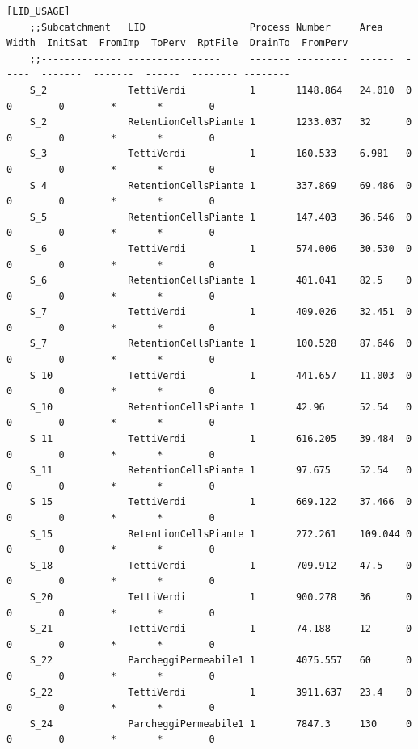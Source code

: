     \begin{landscape}
    \begin{lstlisting}[basicstyle=\scriptsize\ttfamily,numberstyle=\tiny]
    [LID_USAGE]
    ;;Subcatchment   LID                  Process Number     Area    Width  InitSat  FromImp  ToPerv  RptFile  DrainTo  FromPerv
    ;;-------------- ----------------     ------- ---------  ------  -----  -------  -------  ------  -------- --------
    S_2              TettiVerdi           1       1148.864   24.010  0      0        0        *       *        0
    S_2              RetentionCellsPiante 1       1233.037   32      0      0        0        *       *        0
    S_3              TettiVerdi           1       160.533    6.981   0      0        0        *       *        0
    S_4              RetentionCellsPiante 1       337.869    69.486  0      0        0        *       *        0
    S_5              RetentionCellsPiante 1       147.403    36.546  0      0        0        *       *        0
    S_6              TettiVerdi           1       574.006    30.530  0      0        0        *       *        0
    S_6              RetentionCellsPiante 1       401.041    82.5    0      0        0        *       *        0
    S_7              TettiVerdi           1       409.026    32.451  0      0        0        *       *        0
    S_7              RetentionCellsPiante 1       100.528    87.646  0      0        0        *       *        0
    S_10             TettiVerdi           1       441.657    11.003  0      0        0        *       *        0
    S_10             RetentionCellsPiante 1       42.96      52.54   0      0        0        *       *        0
    S_11             TettiVerdi           1       616.205    39.484  0      0        0        *       *        0
    S_11             RetentionCellsPiante 1       97.675     52.54   0      0        0        *       *        0
    S_15             TettiVerdi           1       669.122    37.466  0      0        0        *       *        0
    S_15             RetentionCellsPiante 1       272.261    109.044 0      0        0        *       *        0
    S_18             TettiVerdi           1       709.912    47.5    0      0        0        *       *        0
    S_20             TettiVerdi           1       900.278    36      0      0        0        *       *        0
    S_21             TettiVerdi           1       74.188     12      0      0        0        *       *        0
    S_22             ParcheggiPermeabile1 1       4075.557   60      0      0        0        *       *        0
    S_22             TettiVerdi           1       3911.637   23.4    0      0        0        *       *        0
    S_24             ParcheggiPermeabile1 1       7847.3     130     0      0        0        *       *        0
    \end{lstlisting}
    \end{landscape}
    
